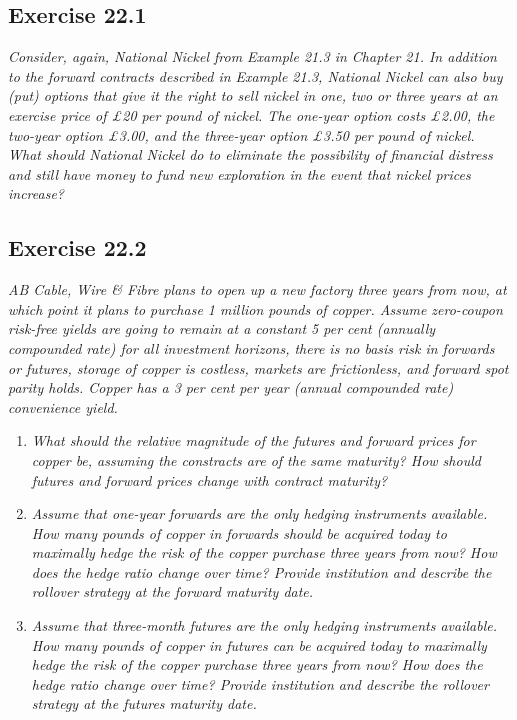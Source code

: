 \documentclass[]{book}
\theoremstyle{definition}
\theoremstyle{definition}
\theoremstyle{remark}
\begin{document}
\subsection{Exercise 22.1}\label{exercise-22.1}

\emph{Consider, again, National Nickel from Example 21.3 in Chapter 21.
In addition to the forward contracts described in Example 21.3, National
Nickel can also buy (put) options that give it the right to sell nickel
in one, two or three years at an exercise price of £20 per pound of
nickel. The one-year option costs £2.00, the two-year option £3.00, and
the three-year option £3.50 per pound of nickel. What should National
Nickel do to eliminate the possibility of financial distress and still
have money to fund new exploration in the event that nickel prices
increase?} \citep[p.751]{book}

\subsection{Exercise 22.2}\label{exercise-22.2}

\emph{AB Cable, Wire \& Fibre plans to open up a new factory three years
from now, at which point it plans to purchase 1 million pounds of
copper. Assume zero-coupon risk-free yields are going to remain at a
constant 5 per cent (annually compounded rate) for all investment
horizons, there is no basis risk in forwards or futures, storage of
copper is costless, markets are frictionless, and forward spot parity
holds. Copper has a 3 per cent per year (annual compounded rate)
convenience yield.} \citep[p.752]{book}

\begin{enumerate}
\def\labelenumi{\alph{enumi}.}
\item
  \emph{What should the relative magnitude of the futures and forward
  prices for copper be, assuming the constracts are of the same
  maturity? How should futures and forward prices change with contract
  maturity?} \citep[p.752]{book}
\item
  \emph{Assume that one-year forwards are the only hedging instruments
  available. How many pounds of copper in forwards should be acquired
  today to maximally hedge the risk of the copper purchase three years
  from now? How does the hedge ratio change over time? Provide
  institution and describe the rollover strategy at the forward maturity
  date.} \citep[p.752]{book}
\item
  \emph{Assume that three-month futures are the only hedging instruments
  available. How many pounds of copper in futures can be acquired today
  to maximally hedge the risk of the copper purchase three years from
  now? How does the hedge ratio change over time? Provide institution
  and describe the rollover strategy at the futures maturity date.}
  \citep[p.752]{book}
\end{enumerate}
\end{document}

